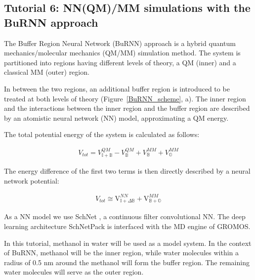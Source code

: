 
\subsection{Tutorial 6: NN(QM)/MM simulations with the BuRNN approach}
The Buffer Region Neural Network (BuRNN) approach \cite{Lier2022BuRNN} is a hybrid quantum mechanics/molecular mechanics (QM/MM) \cite{Warshel1976QM/MM, Senn2009QM/MM} simulation method. The system is partitioned into regions having different levels of theory, a QM (inner) and a classical MM (outer) region. 

In between the two regions, an additional buffer region is introduced to be treated at both levels of theory (Figure~\ref{BuRNN_scheme}, a). The inner region and the interactions between the inner region and the buffer region are described by an atomistic neural network (NN) model, approximating a QM energy.

The total potential energy of the system is calculated as follows:

\begin{equation}
  \begin{aligned}
  V_{tot} = V^{QM}_{\mathbb{I+B}} - V^{QM}_{\mathbb{B}} + V^{MM}_{\mathbb{B}} + V^{MM}_{\mathbb{O}}
    \end{aligned}
\end{equation}


 The energy difference of the first two terms is then directly described by a neural network potential: 
 
\begin{equation}
  \begin{aligned}
  V_{tot} \cong \mathrm{V}_{\mathbb{I+}\Delta\mathbb{B}}^{NN} + \mathrm{V}_{\mathbb{B+O}}^{MM}
    \end{aligned}
\end{equation}


As a NN model we use SchNet \cite{Schuett2017SchNet, Schuett2018SchNet}, a continuous filter convolutional NN. The deep learning architecture SchNetPack \cite{Schuett2019SPK} is interfaced with the MD engine of GROMOS.



In this tutorial, methanol in water will be used as a model system. In the context of BuRNN, methanol will be the inner region, while water molecules within a radius of 0.5 nm around the methanol will form the buffer region. The remaining water molecules will serve as the outer region. 

